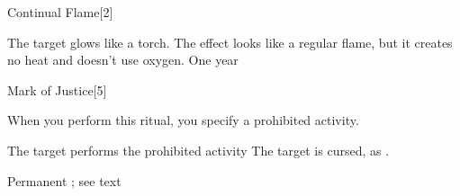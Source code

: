\begin{spellsection}{Continual Flame}[2]
    \begin{spellheader}
    \end{spellheader}
    \begin{spellcontent}
        \begin{spelltargetinginfo}
        \end{spelltargetinginfo}
        \begin{spelleffects}
            \spelleffect The target glows like a torch. The effect looks like a regular flame, but it creates no heat and doesn't use oxygen.
            \spelldur One year
        \end{spelleffects}
    \end{spellcontent}
    \begin{spellfooter}
    \end{spellfooter}
    \begin{spellaugments}
    \end{spellaugments}
\end{spellsection}

\begin{spellsection}{Mark of Justice}[5]
    \begin{spellheader}
    \end{spellheader}
    \begin{spellcontent}
        \begin{spelltargetinginfo}
        \end{spelltargetinginfo}
        \begin{spelleffects}
            \spellspecial When you perform this ritual, you specify a prohibited activity.
            \begin{spelltrigger}{The target performs the prohibited activity}
                \spelleffect The target is cursed, as .
            \end{spelltrigger}
            \spelldur Permanent \dismissable; see text
        \end{spelleffects}
    \end{spellcontent}
    \begin{spellfooter}
        \spellnotes \cursespellnotes
    \end{spellfooter}
\end{spellsection}

